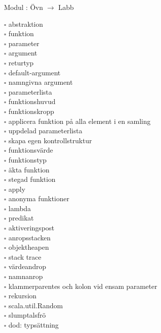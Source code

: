 
    Modul : Övn  $\rightarrow$ Labb 
    \begin{multicols}{3}\SlideFontTiny
    $\square$ abstraktion \\
$\square$ funktion \\
$\square$ parameter \\
$\square$ argument \\
$\square$ returtyp \\
$\square$ default-argument \\
$\square$ namngivna argument \\
$\square$ parameterlista \\
$\square$ funktionshuvud \\
$\square$ funktionskropp \\
$\square$ applicera funktion på alla element i en samling \\
$\square$ uppdelad parameterlista \\
$\square$ skapa egen kontrollstruktur \\
$\square$ funktionsvärde \\
$\square$ funktionstyp \\
$\square$ äkta funktion \\
$\square$ stegad funktion \\
$\square$ apply \\
$\square$ anonyma funktioner \\
$\square$ lambda \\
$\square$ predikat \\
$\square$ aktiveringspost \\
$\square$ anropsstacken \\
$\square$ objektheapen \\
$\square$ stack trace \\
$\square$ värdeandrop \\
$\square$ namnanrop \\
$\square$ klammerparentes och kolon vid ensam parameter \\
$\square$ rekursion \\
$\square$ scala.util.Random \\
$\square$ slumptalsfrö \\
$\square$ dod: typsättning \\
    \end{multicols}
    